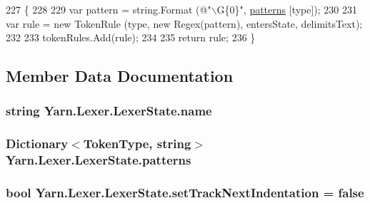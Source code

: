 \begin{DoxyCode}
227                                                                                                            
            \{
228 
229                 var pattern = string.Format (\textcolor{stringliteral}{@"\(\backslash\)G\{0\}"}, \hyperlink{a00102_a951f91e9522ffe84851f2e25e9445106}{patterns} [type]);
230 
231                 var rule = \textcolor{keyword}{new} TokenRule (type, \textcolor{keyword}{new} Regex(pattern), entersState, delimitsText);
232 
233                 tokenRules.Add(rule);
234 
235                 \textcolor{keywordflow}{return} rule;
236             \}
\end{DoxyCode}


\subsection{Member Data Documentation}
\hypertarget{a00102_aeb8debd0d81a76e90f083f0bf407573e}{
\subsubsection[{name}]{\setlength{\rightskip}{0pt plus 5cm}string Yarn.\-Lexer.\-Lexer\-State.\-name}}\label{a00102_aeb8debd0d81a76e90f083f0bf407573e}
\hypertarget{a00102_a951f91e9522ffe84851f2e25e9445106}{
\subsubsection[{patterns}]{\setlength{\rightskip}{0pt plus 5cm}Dictionary$<${\bf Token\-Type}, string$>$ Yarn.\-Lexer.\-Lexer\-State.\-patterns\hspace{0.3cm}{\ttfamily [private]}}}\label{a00102_a951f91e9522ffe84851f2e25e9445106}
\hypertarget{a00102_ad8b6ccac53bedd9dc202ffe6ac5698b2}{
\subsubsection[{set\-Track\-Next\-Indentation}]{\setlength{\rightskip}{0pt plus 5cm}bool Yarn.\-Lexer.\-Lexer\-State.\-set\-Track\-Next\-Indentation = false}}\label{a00102_ad8b6ccac53bedd9dc202ffe6ac5698b2}
